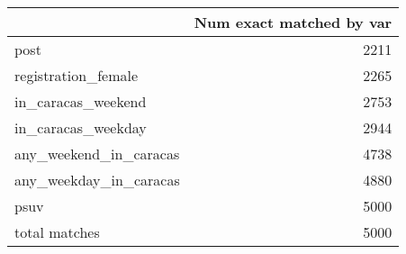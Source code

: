 \begin{tabular}{lr}
\toprule
{} &  Num exact matched by var \\
\midrule
post                   &                      2211 \\
registration\_female    &                      2265 \\
in\_caracas\_weekend     &                      2753 \\
in\_caracas\_weekday     &                      2944 \\
any\_weekend\_in\_caracas &                      4738 \\
any\_weekday\_in\_caracas &                      4880 \\
psuv                   &                      5000 \\
total matches          &                      5000 \\
\bottomrule
\end{tabular}
